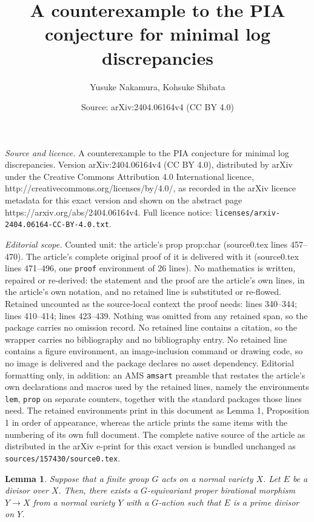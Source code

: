 \documentclass[10pt,a4paper]{amsart}
\title{A counterexample to the PIA conjecture for minimal log discrepancies}
\author{Yusuke Nakamura, Kohsuke Shibata}
\date{Source: arXiv:2404.06164v4 (CC BY 4.0)}
\newtheorem{lem}{Lemma}
\begin{document}
\maketitle

\noindent\emph{Source and licence.} A counterexample to the PIA conjecture for minimal log discrepancies. Version arXiv:2404.06164v4 (CC BY 4.0), distributed by arXiv under the Creative Commons Attribution 4.0 International licence, http://creativecommons.org/licenses/by/4.0/, as recorded in the arXiv licence metadata for this exact version and shown on the abstract page https://arxiv.org/abs/2404.06164v4. Full licence notice: \texttt{licenses/arxiv-2404.06164-CC-BY-4.0.txt}.\par\smallskip

\noindent\textit{Editorial scope.} Counted unit: the article's prop prop:char (source0.tex lines 457--470). The article's complete original proof of it is delivered with it (source0.tex lines 471--496, one \texttt{proof} environment of 26 lines). No mathematics is written, repaired or re-derived: the statement and the proof are the article's own lines, in the article's own notation, and no retained line is substituted or re-flowed.  Retained uncounted as the source-local context the proof needs: lines 340--344; lines 410--414; lines 423--439.  Nothing was omitted from any retained span, so the package carries no omission record.  No retained line contains a citation, so the wrapper carries no bibliography and no bibliography entry.  No retained line contains a figure environment, an image-inclusion command or drawing code, so no image is delivered and the package declares no asset dependency.  Editorial formatting only, in addition: an AMS \texttt{amsart} preamble that restates the article's own declarations and macros used by the retained lines, namely the environments \texttt{lem}, \texttt{prop} on separate counters, together with the standard packages those lines need.  The retained environments print in this document as Lemma 1, Proposition 1 in order of appearance, whereas the article prints the same items with the numbering of its own full document.  The complete native source of the article as distributed in the arXiv e-print for this exact version is bundled unchanged as \texttt{sources/157430/source0.tex}.
\begin{lem}\label{lem:equiv_resol}
Suppose that a finite group $G$ acts on a normal variety $X$. 
Let $E$ be a divisor over $X$. 
Then, there exists a $G$-equivariant proper birational morphism $Y \to X$ from a normal variety $Y$ with a $G$-action such that $E$ is a prime divisor on $Y$. 
\end{lem}
\end{document}
